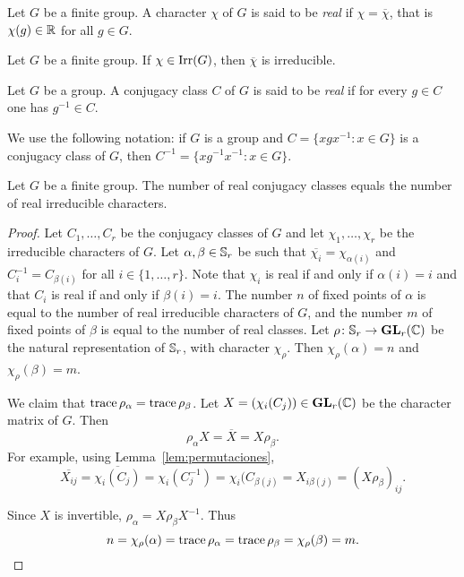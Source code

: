 \begin{definition}
  Let $G$ be a finite group. A character $\chi$ of $G$ is said to be
  \emph{real} if
  $\chi=\overline{\chi}$, that is $\chi(g)\in\mathbb{R}$ for all $g\in G$. 
\end{definition}

\begin{exercise}
	\label{xca:chi_irreducible}
	Let $G$ be a finite group. If $\chi\in\operatorname{Irr}(G)$, then 
	$\overline{\chi}$ is irreducible.
\end{exercise}

\begin{definition}
  Let $G$ be a group. A conjugacy class $C$ of $G$ is said to be
  \emph{real} if for every $g\in C$ one has $g^{-1}\in C$. 
\end{definition}

We use the following notation: if $G$ is a group and $C=\{xgx^{-1}:x\in G\}$ is a conjugacy class of  
$G$, then $C^{-1}=\{xg^{-1}x^{-1}:x\in G\}$.  

\begin{theorem}[Burnside]
    Let $G$ be a finite group. The number of real conjugacy classes 
    equals the number of real irreducible characters. 
\end{theorem}

\begin{proof}
  Let $C_1,\dots,C_r$ be the conjugacy classes of $G$ and  
  let $\chi_1,\dots,\chi_r$ be the irreducible characters of $G$. 
  Let $\alpha,\beta\in\mathbb{S}_r$ be such that $\overline{\chi_i}=\chi_{\alpha(i)}$ and 
  $C_i^{-1}=C_{\beta(i)}$ for all $i\in\{1,\dots,r\}$. Note that $\chi_i$
  is real if and only if $\alpha(i)=i$ and that $C_i$ is real if and only if 
  $\beta(i)=i$. The number $n$ of fixed points of $\alpha$ is equal to the number
  of real irreducible characters of $G$, and the number $m$ of fixed points of $\beta$ is equal
  to the number of real classes. 
  Let $\rho\colon\mathbb{S}_r\to\mathbf{GL}_r(\mathbb{C})$ be the natural representation of $\mathbb{S}_r$, with character $\chi_\rho$.
  Then $\chi_\rho(\alpha)=n$ and $\chi_\rho(\beta)=m$. 
  
  We claim that 
  $\operatorname{trace}\rho_\alpha=\operatorname{trace}\rho_\beta$. Let $X=(\chi_i(C_j))\in\mathbf{GL}_r(\mathbb{C})$ be the character matrix of $G$. 
  Then 
  \[
	\rho_\alpha X=\overline{X}=X\rho_\beta.
  \]
  For example, using Lemma~\ref{lem:permutaciones}, 
  \[
  \overline{X_{ij}}=\overline{\chi_i(C_j)}
  =\chi_i(C_j^{-1})=\chi_i(C_{\beta(j)}=X_{i\beta(j)}=(X\rho_\beta)_{ij}.
  \]
  
  Since $X$ is invertible, $\rho_{\alpha}=X\rho_{\beta}X^{-1}$. Thus 
  \[
    n=\chi_{\rho}(\alpha)=\operatorname{trace}\rho_{\alpha}=\operatorname{trace}\rho_{\beta}=\chi_{\rho}(\beta)=m.\qedhere
  \]
\end{proof}

